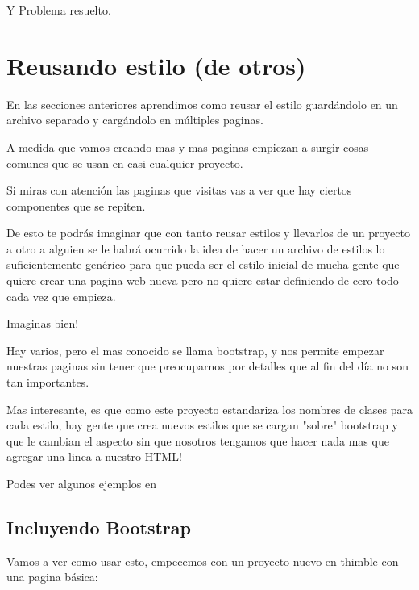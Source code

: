 \documentclass[letterpaper,10pt,spanish]{sphinxmanual}
\begin{document}
Y Problema resuelto.


\chapter{Reusando estilo (de otros)}
\label{\detokenize{reusando-estilo-de-otros:reusando-estilo-de-otros}}\label{\detokenize{reusando-estilo-de-otros::doc}}
En las secciones anteriores aprendimos como reusar el estilo guardándolo en un archivo separado y cargándolo en múltiples paginas.

A medida que vamos creando mas y mas paginas empiezan a surgir cosas comunes que se usan en casi cualquier proyecto.

Si miras con atención las paginas que visitas vas a ver que hay ciertos componentes que se repiten.

De esto te podrás imaginar que con tanto reusar estilos y llevarlos de un proyecto a otro a alguien se le habrá ocurrido la idea de hacer un archivo de estilos lo suficientemente genérico para que pueda ser el estilo inicial de mucha gente que quiere crear una pagina web nueva pero no quiere estar definiendo de cero todo cada vez que empieza.

Imaginas bien!

Hay varios, pero el mas conocido se llama bootstrap, y nos permite empezar nuestras paginas sin tener que preocuparnos por detalles que al fin del día no son tan importantes.

Mas interesante, es que como este proyecto estandariza los nombres de clases para cada estilo, hay gente que crea nuevos estilos que se cargan "sobre" bootstrap y que le cambian el aspecto sin que nosotros tengamos que hacer nada mas que agregar una linea a nuestro HTML!

Podes ver algunos ejemplos en 


\section{Incluyendo Bootstrap}
\label{\detokenize{reusando-estilo-de-otros:incluyendo-bootstrap}}
Vamos a ver como usar esto, empecemos con un proyecto nuevo en thimble con una
pagina básica:
\end{document}
